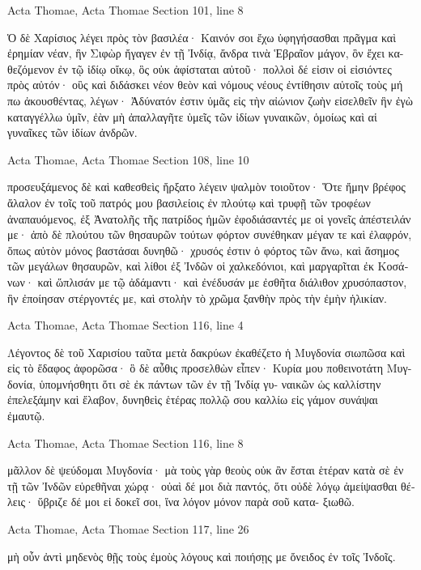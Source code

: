 \documentclass[12pt,letterpaper,twoside,final]{memoir}
\begin{document}
\begin{greek}
Acta Thomae, Acta Thomae 
Section 101, line 8

                Ὁ δὲ Χαρίσιος λέγει πρὸς τὸν βασιλέα· Καινόν 
σοι ἔχω ὑφηγήσασθαι πρᾶγμα καὶ ἐρημίαν νέαν, ἣν Σιφὼρ   
ἤγαγεν ἐν τῇ Ἰνδίᾳ, ἄνδρα τινὰ Ἑβραῖον μάγον, ὃν ἔχει κα-
θεζόμενον ἐν τῷ ἰδίῳ οἴκῳ, ὃς οὐκ ἀφίσταται αὐτοῦ· πολλοὶ 
δέ εἰσιν οἱ εἰσιόντες πρὸς αὐτόν· οὓς καὶ διδάσκει νέον θεὸν 
καὶ νόμους νέους ἐντίθησιν αὐτοῖς τοὺς μή πω ἀκουσθέντας, 
λέγων· Ἀδύνατόν ἐστιν ὑμᾶς εἰς τὴν αἰώνιον ζωὴν εἰσελθεῖν 
ἣν ἐγὼ καταγγέλλω ὑμῖν, ἐὰν μὴ ἀπαλλαγῆτε ὑμεῖς τῶν ἰδίων 
γυναικῶν, ὁμοίως καὶ αἱ γυναῖκες τῶν ἰδίων ἀνδρῶν. 



Acta Thomae, Acta Thomae 
Section 108, line 10

                                                  προσευξάμενος δὲ 
καὶ καθεσθεὶς ἤρξατο λέγειν ψαλμὸν τοιοῦτον· Ὅτε ἤμην 
βρέφος ἄλαλον ἐν τοῖς τοῦ πατρός μου βασιλείοις ἐν πλούτῳ 
καὶ τρυφῇ τῶν τροφέων ἀναπαυόμενος, ἐξ Ἀνατολῆς τῆς 
πατρίδος ἡμῶν ἐφοδιάσαντές με οἱ γονεῖς ἀπέστειλάν με· 
ἀπὸ δὲ πλούτου τῶν θησαυρῶν τούτων φόρτον συνέθηκαν 
μέγαν τε καὶ ἐλαφρόν, ὅπως αὐτὸν μόνος βαστάσαι δυνηθῶ· 
χρυσός ἐστιν ὁ φόρτος τῶν ἄνω, καὶ ἄσημος τῶν μεγάλων   
θησαυρῶν, καὶ λίθοι ἐξ Ἰνδῶν οἱ χαλκεδόνιοι, καὶ μαργαρῖται 
ἐκ Κοσάνων· καὶ ὥπλισάν με τῷ ἀδάμαντι· καὶ ἐνέδυσάν με 
ἐσθῆτα διάλιθον χρυσόπαστον, ἣν ἐποίησαν στέργοντές με, 
καὶ στολὴν τὸ χρῶμα ξανθὴν πρὸς τὴν ἐμὴν ἡλικίαν. 



Acta Thomae, Acta Thomae 
Section 116, line 4

Λέγοντος δὲ τοῦ Χαρισίου ταῦτα μετὰ δακρύων 
ἐκαθέζετο ἡ Μυγδονία σιωπῶσα καὶ εἰς τὸ ἔδαφος ἀφορῶσα· 
ὃ δὲ αὖθις προσελθὼν εἶπεν· Κυρία μου ποθεινοτάτη Μυγ-
δονία, ὑπομνήσθητι ὅτι σὲ ἐκ πάντων τῶν ἐν τῇ Ἰνδίᾳ γυ-
ναικῶν ὡς καλλίστην ἐπελεξάμην καὶ ἔλαβον, δυνηθεὶς ἑτέρας 
πολλῷ σου καλλίω εἰς γάμον συνάψαι ἐμαυτῷ. 



Acta Thomae, Acta Thomae 
Section 116, line 8

                                                    μᾶλλον δὲ 
ψεύδομαι Μυγδονία· μὰ τοὺς γὰρ θεοὺς οὐκ ἂν ἔσται ἑτέραν 
κατὰ σὲ ἐν τῇ τῶν Ἰνδῶν εὑρεθῆναι χώρᾳ· οὐαὶ δέ μοι διὰ 
παντός, ὅτι οὐδὲ   
λόγῳ ἀμείψασθαι θέλεις· 
ὕβριζε δέ μοι εἰ δοκεῖ σοι, ἵνα 
λόγον μόνον παρὰ σοῦ κατα-
ξιωθῶ. 



Acta Thomae, Acta Thomae 
Section 117, line 26

                                μὴ οὖν ἀντὶ μηδενὸς θῇς τοὺς 
ἐμοὺς λόγους καὶ ποιήσῃς με ὄνειδος ἐν τοῖς Ἰνδοῖς. 




\end{greek}
\end{document}
